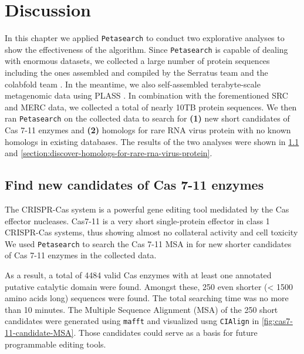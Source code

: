 \chapter{Discussion} \label{chapter:discussion}




In this chapter we applied \texttt{Petasearch} to conduct two explorative analyses to show the effectiveness of the algorithm. Since \texttt{Petasearch} is capable of dealing with enormous datasets, we collected a large number of protein sequences including the ones assembled and compiled by the Serratus team \cite{edgar_petabase-scale_2022}
and the colabfold team \cite{mirdita_colabfold_2022}.
In the meantime, we also self-assembled terabyte-scale metagenomic data using PLASS \cite{steinegger_protein-level_2019}. In combination with the forementioned SRC and MERC data, we collected a total of nearly 10TB protein sequences. We then ran \texttt{Petasearch} on the collected data to search for \textbf{(1)} new short candidates of Cas 7-11 enzymes and \textbf{(2)} homologs for rare RNA virus protein with no known homologs in existing databases. The results of the two analyses were shown in \cref{section:find-new-candidates-of-cas-7-11-enzymes} and \cref{section:discover-homologs-for-rare-rna-virus-protein}.

\section{Find new candidates of Cas 7-11 enzymes} \label{section:find-new-candidates-of-cas-7-11-enzymes}

The CRISPR-Cas system is a powerful gene editing tool medidated by the Cas effector nucleases. Cas7-11 is a very short single-protein effector in class 1 CRISPR-Cas systems, thus showing almost no collateral activity and cell toxicity \cite{ozcan_programmable_2021}
We used \texttt{Petasearch} to search the Cas 7-11 MSA in \cite{ozcan_programmable_2021}
for new shorter candidates of Cas 7-11 enzymes in the collected data.

As a result, a total of 4484 valid Cas enzymes with at least one annotated putative catalytic domain were found. Amongst these, 250 even shorter (< 1500 amino acids long) sequences were found. The total searching time was no more than 10 minutes. The Multiple Sequence Alignment (MSA) of the 250 short candidates were generated using \texttt{mafft} \cite{katoh_mafft_2013} and visualized usng \texttt{CIAlign} \cite{tumescheit_cialign_2022} in \cref{fig:cas7-11-candidate-MSA}. Those candidates could serve as a basis for future programmable editing tools.

